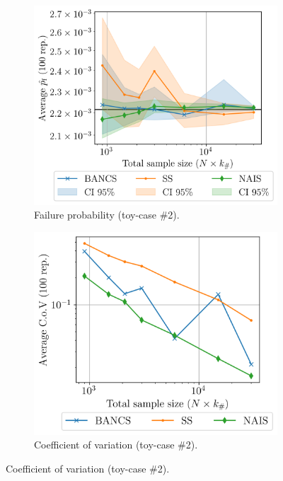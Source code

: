 \begin{figure}
    \centering
    \begin{subfigure}[b]{0.49\linewidth}
        \centering
        \includegraphics[width=\linewidth]{part3/figures/BANCS/RP4B_mean.png}
        \caption{Failure probability (toy-case \#2).}
    \end{subfigure}
    \begin{subfigure}[b]{0.47\linewidth}
        \centering
        \includegraphics[width=\linewidth]{part3/figures/BANCS/RP4B_cov.png}
        \caption{Coefficient of variation (toy-case \#2).}

\end{subfigure}
\end{figure}
